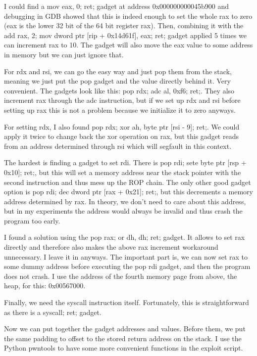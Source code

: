         I could find a mov eax, 0; ret; gadget at address 0x000000000045b900 and debugging in GDB showed that this is indeed
        enough to set the whole rax to zero (eax is the lower 32 bit of the 64 bit register rax). Then, combining it with the
        add rax, 2; mov dword ptr [rip + 0x14d61f], eax; ret; gadget applied 5 times we can increment rax to 10. The gadget
        will also move the eax value to some address in memory but we can just ignore that.

        For rdx and rsi, we can go the easy way and just pop them from the stack, meaning we just put the pop gadget and the
        value directly behind it. Very convenient. The gadgets look like this: pop rdx; adc al, 0xf6; ret;. They also
        increment rax through the adc instruction, but if we set up rdx and rsi before setting up rax this is not a
        problem because we initialize it to zero anyways.

        For setting rdx, I also found pop rdx; xor ah, byte ptr [rsi - 9]; ret;. We could apply it twice to change back the
        xor operation on rax, but this gadget reads from an address determined through rsi which will segfault in this
        context.

        The hardest is finding a gadget to set rdi. There is pop rdi; sete byte ptr [rsp + 0x10]; ret;, but this will set
        a memory address near the stack pointer with the second instruction and thus mess up the ROP chain. The only other good
        gadget option is pop rdi; dec dword ptr [rax + 0x21]; ret;,  but this decrements a memory address determined by rax.
        In theory, we don't need to care about this address, but in my experiments the address would always be invalid and
        thus crash the program too early.

        I found a solution using the pop rax; or dh, dh; ret; gadget. It allows to set rax directly and therefore also makes
        the above rax increment workaround unnecessary. I leave it in anyways. The important part is, we can now set rax to
        some dummy address before executing the pop rdi gadget, and then the program does not crash. I use the address of the
        fourth memory page from above, the heap, for this: 0x00567000.

        Finally, we need the syscall instruction itself. Fortunately, this is straightforward as there is a syscall; ret;
        gadget.

        Now we can put together the gadget addresses and values. Before them, we put the same padding to offset to the stored
        return address on the stack. I use the Python pwntools to have some more convenient functions in the exploit script.

